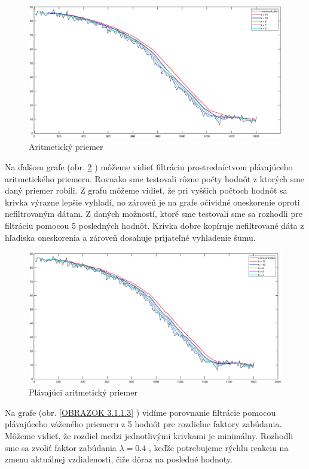 \begin{figure}
	\centering
	\includegraphics[width=170mm]{obr/aritmeticky.eps}
	\caption{Aritmetický priemer}\label{OBRAZOK 3.1.1.1} 
\end{figure}

Na ďalšom grafe (obr. \ref{OBRAZOK 3.1.1.2} ) môžeme vidieť filtráciu prostredníctvom plávajúceho aritmetického priemeru. Rovnako sme testovali rôzne počty hodnôt z ktorých sme daný priemer robili. Z grafu môžeme vidieť, že pri vyšších počtoch hodnôt sa krivka výrazne lepšie vyhladí, no zároveň je na grafe očividné oneskorenie oproti nefiltrovaným dátam. Z daných možností, ktoré sme testovali sme sa rozhodli pre filtráciu pomocou 5 posledných hodnôt. Krivka dobre kopíruje nefiltrované dáta z hľadiska oneskorenia a zároveň dosahuje prijateľné vyhladenie šumu.

\begin{figure}
	\centering
	\includegraphics[width=170mm]{obr/plavajuciAritmeticky.eps}
	\caption{Plávajúci aritmetický priemer}\label{OBRAZOK 3.1.1.2} 
\end{figure}

Na grafe (obr. \ref{OBRAZOK 3.1.1.3} ) vidíme porovnanie filtrácie pomocou plávajúceho váženého priemeru z 5 hodnôt pre rozdielne faktory zabúdania. Môžeme vidieť, že rozdiel medzi jednotlivými krivkami je minimálny. Rozhodli sme sa zvoliť faktor zabúdania $\lambda = 0.4$ , keďže potrebujeme rýchlu reakciu na zmenu aktuálnej vzdialenosti, čiže dôraz na posledné hodnoty.


